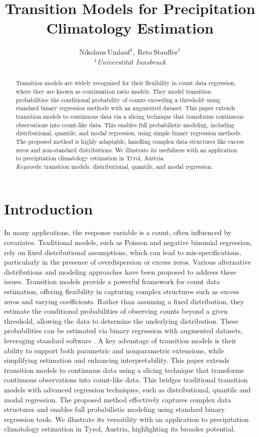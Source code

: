 \documentclass[english,a4paper,11pt]{article}
\date{}
\title{Transition Models for Precipitation Climatology Estimation}
\author{$\mathrm{Nikolaus \ Umlauf}^\mathrm{1},  
	\  \mathrm{Reto \ Stauffer}^\mathrm{1}$\\  
	$^\mathrm{1}$\small{\emph{Universtit\"at Innsbruck}}\\
}
\begin{document}
\maketitle

\begin{abstract}
Transition models are widely recognized for their flexibility in count data regression, where they
are known as continuation ratio models. They model transition probabilities--the conditional
probability of counts exceeding a threshold--using standard binary regression methods with an
augmented dataset.
This paper extends transition models to continuous data via a slicing technique that transforms
continuous observations into count-like data. This enables full probabilistic modeling,
including distributional, quantile, and modal regression, using simple binary regression methods.
The proposed method is highly adaptable, handling complex data structures like excess zeros
and non-standard distributions. We illustrate its usefulness with an application to precipitation
climatology estimation in Tyrol, Austria.
\noindent 
\hspace{1cm}\\
\emph{Keywords}:  transition models, distributional, quantile, and modal regression.
\end{abstract}

\section{Introduction}\label{sec:intro}

In many applications, the response variable is a count, often influenced by covariates.
Traditional models, such as Poisson and negative binomial regression, rely on fixed distributional
assumptions, which can lead to mis-specifications, particularly in the presence of overdispersion
or excess zeros. Various alternative distributions and modeling approaches have been proposed to
address these issues.
Transition models provide a powerful framework for count data estimation, offering flexibility
in capturing complex structures such as excess zeros and varying coefficients. Rather than assuming
a fixed distribution, they estimate the conditional probabilities of observing counts beyond a
given threshold, allowing the data to determine the underlying distribution. These probabilities
can be estimated via binary regression with augmented datasets, leveraging standard software
\cite{Berger:2021}. A key advantage of transition models is their ability to support both
parametric and nonparametric extensions, while simplifying estimation and enhancing interpretability.
This paper extends transition models to continuous data using a slicing technique that transforms
continuous observations into count-like data. This bridges traditional transition models with
advanced regression techniques, such as distributional, quantile and modal regression. The proposed
method effectively captures complex data structures and enables full probabilistic modeling using
standard binary regression tools. We illustrate its versatility with an application to
precipitation climatology estimation in Tyrol, Austria, highlighting its broader potential.
\end{document}
